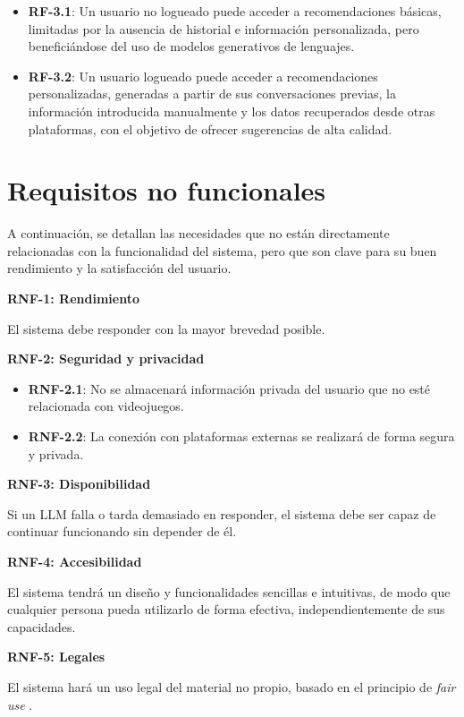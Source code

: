 \begin{itemize}
    \item \textbf{RF-3.1}: Un usuario no logueado puede acceder a recomendaciones básicas, limitadas por la ausencia de historial e información personalizada, pero beneficiándose del uso de modelos generativos de lenguajes.
    \item \textbf{RF-3.2}: Un usuario logueado puede acceder a recomendaciones personalizadas, generadas a partir de sus conversaciones previas, la información introducida manualmente y los datos recuperados desde otras plataformas, con el objetivo de ofrecer sugerencias de alta calidad.
\end{itemize}

\newpage
\section{Requisitos no funcionales}

A continuación, se detallan las necesidades que no están directamente relacionadas con la funcionalidad del sistema, pero que son clave para su buen rendimiento y la satisfacción del usuario.

\textbf{RNF-1: Rendimiento}

El sistema debe responder con la mayor brevedad posible.

\textbf{RNF-2: Seguridad y privacidad}

\begin{itemize}
    \item \textbf{RNF-2.1}: No se almacenará información privada del usuario que no esté relacionada con videojuegos.
    \item \textbf{RNF-2.2}: La conexión con plataformas externas se realizará de forma segura y privada.
\end{itemize}

\textbf{RNF-3: Disponibilidad}

Si un LLM falla o tarda demasiado en responder, el sistema debe ser capaz de continuar funcionando sin depender de él.

\textbf{RNF-4: Accesibilidad}

El sistema tendrá un diseño y funcionalidades sencillas e intuitivas, de modo que cualquier persona pueda utilizarlo de forma efectiva, independientemente de sus capacidades.

\textbf{RNF-5: Legales}

El sistema hará un uso legal del material no propio, basado en el principio de \textit{fair use} \cite{yankwich1954fair}.

